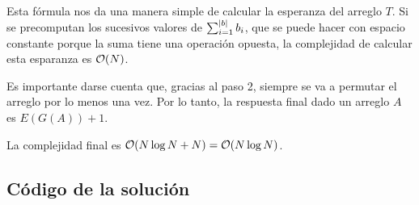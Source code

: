 Esta fórmula nos da una manera simple de calcular la esperanza del arreglo \(T\). Si se precomputan los sucesivos valores de \(\sum\nolimits^{\left|b\right|}_{i = 1}{b_i}\), que se puede hacer con espacio constante porque la suma tiene una operación opuesta, la complejidad de calcular esta esparanza es \(\mathcal{O}(N)\).

Es importante darse cuenta que, gracias al paso 2, siempre se va a permutar el arreglo por lo menos una vez. Por lo tanto, la respuesta final dado un arreglo \(A\) es \(E\left(G\left(A\right)\right) + 1\).

La complejidad final es \(\mathcal{O}(N \log N + N) = \mathcal{O}(N \log N)\).

\subsection{Código de la solución}
\lstset{inputencoding=utf8/latin1}
%
